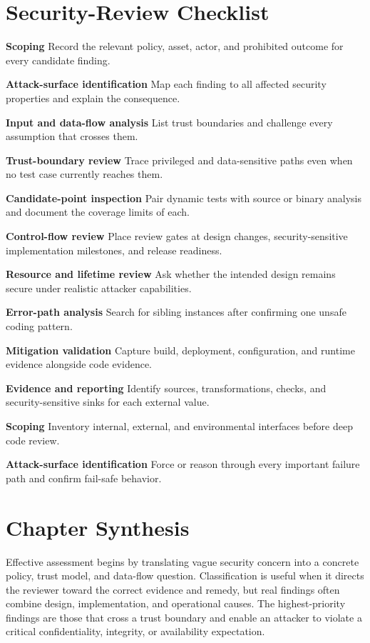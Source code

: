 \documentclass[11pt,letterpaper]{article}
\begin{document}
\section{Security-Review Checklist}
\begin{CornellChecklist}
\item \textbf{Scoping}
Record the relevant policy, asset, actor, and prohibited outcome for every candidate finding.
\item \textbf{Attack-surface identification}
Map each finding to all affected security properties and explain the consequence.
\item \textbf{Input and data-flow analysis}
List trust boundaries and challenge every assumption that crosses them.
\item \textbf{Trust-boundary review}
Trace privileged and data-sensitive paths even when no test case currently reaches them.
\item \textbf{Candidate-point inspection}
Pair dynamic tests with source or binary analysis and document the coverage limits of each.
\item \textbf{Control-flow review}
Place review gates at design changes, security-sensitive implementation milestones, and release readiness.
\item \textbf{Resource and lifetime review}
Ask whether the intended design remains secure under realistic attacker capabilities.
\item \textbf{Error-path analysis}
Search for sibling instances after confirming one unsafe coding pattern.
\item \textbf{Mitigation validation}
Capture build, deployment, configuration, and runtime evidence alongside code evidence.
\item \textbf{Evidence and reporting}
Identify sources, transformations, checks, and security-sensitive sinks for each external value.
\item \textbf{Scoping}
Inventory internal, external, and environmental interfaces before deep code review.
\item \textbf{Attack-surface identification}
Force or reason through every important failure path and confirm fail-safe behavior.
\end{CornellChecklist}
\section{Chapter Synthesis}
Effective assessment begins by translating vague security concern into a concrete policy, trust model, and data-flow question. Classification is useful when it directs the reviewer toward the correct evidence and remedy, but real findings often combine design, implementation, and operational causes. The highest-priority findings are those that cross a trust boundary and enable an attacker to violate a critical confidentiality, integrity, or availability expectation.
\end{document}
